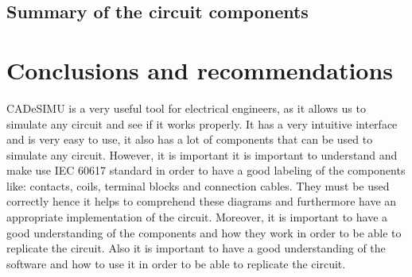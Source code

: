 \documentclass[runningheads]{llncs}
\begin{document}
\subsection{Summary of the circuit components}



\section{Conclusions and recommendations}
CADeSIMU is a very useful tool for electrical engineers, as it allows us to simulate any circuit and see if it works properly.
It has a very intuitive interface and is very easy to use, it also has a lot of components that can be used to simulate any circuit.
However, it is important it is important to understand and make use IEC 60617 standard in order to have a good labeling of the components like: 
contacts, coils, terminal blocks and connection cables.
They must be used correctly hence it helps to comprehend these diagrams and furthermore have an appropriate implementation of the circuit.
Moreover, it is important to have a good understanding of the components and how they work in order to be able to replicate the circuit. 
Also it is important to have a good understanding of the software and how to use it in order to be able to replicate the circuit.



% 
% 
\end{document}

